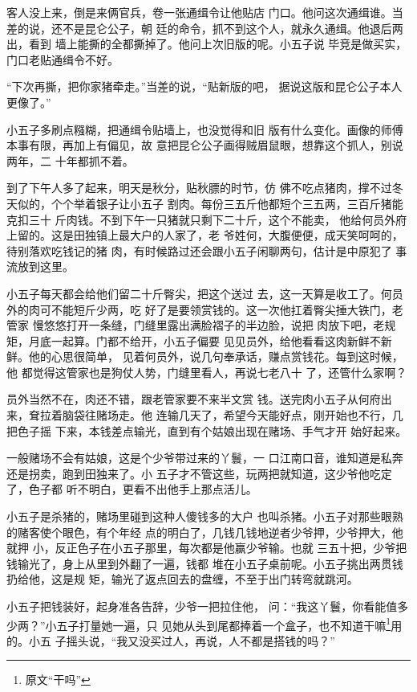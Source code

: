 客人没上来，倒是来俩官兵，卷一张通缉令让他贴店
门口。他问这次通缉谁。当差的说，还不是昆仑公子，朝
廷的命令，抓不到这个人，就永久通缉。他退后两出，看到
墙上能撕的全都撕掉了。他问上次旧版的呢。小五子说
毕竞是做买实，门口老贴通缉令不好。

“下次再撕，把你家猪牵走。”当差的说，“贴新版的吧，
据说这版和昆仑公子本人更像了。”

小五子多刷点糨糊，把通缉令贴墙上，也没觉得和旧
版有什么变化。画像的师傅本事有限，再加上有偏见，故
意把昆仑公子画得贼眉鼠眼，想靠这个抓人，别说两年，二
十年都抓不着。

到了下午人多了起来，明天是秋分，贴秋膘的时节，仿
佛不吃点猪肉，撑不过冬天似的，个个举着银子让小五子
割肉。每份三五斤他都短个三五两，三百斤猪能克扣三十
斤肉钱。不到下午一只猪就只剩下二十斤，这个不能卖，
他给何员外府上留的。这是田独镇上最大户的人家了，老
爷姓何，大腹便便，成天笑呵呵的，待别落欢吃钱记的猪
肉，有时候路过还会跟小五子闲聊两句，估计是中原犯了
事流放到这里。

小五子每天都会给他们留二十斤臀尖，把这个送过
去，这一天算是收工了。何员外的肉可不能短斤少两，吃
好了是要领赏钱的。这一次他扛着臀尖捶大铁门，老管家
慢悠悠打开一条缝，门缝里露出满脸褶子的半边脸，说把
肉放下吧，老规矩，月底一起算。门都不给开，小五子偏要
见见员外，给他看看这肉新鲜不新鲜。他的心思很简单，
见着何员外，说几句奉承话，赚点赏钱花。每到这时候，他
都觉得这管家也是狗仗人势，门缝里看人，再说七老八十
了，还管什么家啊？

员外当然不在，肉还不错，跟老管家要不来半文赏
钱。送完肉小五子从何府出来，耷拉着脑袋往赌场走。他
连输几天了，希望今天能好点，刚开始也不行，几把色子摇
下来，本钱差点输光，直到有个姑娘出现在赌场、手气才开
始好起来。

一般赌场不会有姑娘，这是个少爷带过来的丫鬟，一
口江南口音，谁知道是私奔还是拐卖，跑到田独来了。小
五子才不管这些，玩两把就知道，这少爷他吃定了，色子都
听不明白，更看不出他手上那点活儿。

小五子是杀猪的，赌场里碰到这种人傻钱多的大户
也叫杀猪。小五子对那些眼熟的赌客使个眼色，有个年经
点的明白了，几钱几钱地逆者少爷押，少爷押大，他就押
小，反正色子在小五子那里，每次都是他赢少爷输。也就
三五十把，少爷把钱输光了，身上从里到外翻了一遍，钱都
堆在小五子桌前呢。小五子挑出两贯钱扔给他，这是规
矩，输光了返点回去的盘缠，不至于出门转弯就跳河。

小五子把钱装好，起身准各告辞，少爷一把拉住他，
问：“我这丫鬟，你看能值多少两？”小五子打量她一遍，只
见她从头到尾都捧着一个盒子，也不知道干嘛\footnote{原文“干吗”}用的。小五
子摇头说，“我又没买过人，再说，人不都是搭钱的吗？”

